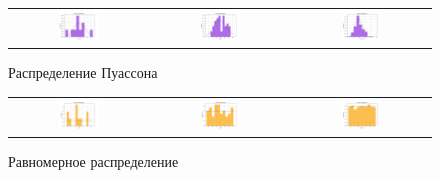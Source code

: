 \documentclass[a4paper,14pt]{article}
\begin{document}
	\begin{figure}[H]
		\centering
		\begin{tabular}{c c c}
			\includegraphics[height = 0.25\textheight, width = 0.31\textwidth]{../image/lab1/lab1_poisson_10.png}
			& \includegraphics[height = 0.25\textheight, width = 0.31\textwidth]{../image/lab1/lab1_poisson_50.png}
			& \includegraphics[height = 0.25\textheight, width = 0.31\textwidth]{../image/lab1/lab1_poisson_1000.png}
		\end{tabular}
		\caption{Распределение Пуассона}
	\end{figure}
	
	\begin{figure}[H]
		\centering
		\begin{tabular}{c c c}
			\includegraphics[height = 0.25\textheight, width = 0.31\textwidth]{../image/lab1/lab1_uniform_10.png}
			& \includegraphics[height = 0.25\textheight, width = 0.31\textwidth]{../image/lab1/lab1_uniform_50.png}
			& \includegraphics[height = 0.25\textheight, width = 0.31\textwidth]{../image/lab1/lab1_uniform_1000.png}
		\end{tabular}
		\caption{Равномерное распределение}
	\end{figure}
\end{document}

